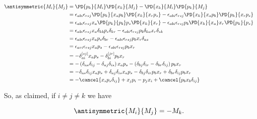 \begin{align*}
\antisymmetric{M_i}{M_j} 
&=
\PD{p_k}{M_i}
\PD{x_k}{M_j}
-
\PD{x_k}{M_i}
\PD{p_k}{M_j} \\
&=
\epsilon_{a b i}
\epsilon_{r s j}
\PD{p_k}{x_a p_b}
\PD{x_k}{x_r p_s}
-
\epsilon_{a b i} 
\epsilon_{r s j}
\PD{x_k}{x_a p_b}
\PD{p_k}{x_r p_s} \\
&=
\epsilon_{a b i}
\epsilon_{r s j}
x_a \PD{p_k}{p_b}
p_s \PD{x_k}{x_r}
-
\epsilon_{a b i} 
\epsilon_{r s j}
p_b \PD{x_k}{x_a}
x_r \PD{p_k}{p_s} \\
&=
\epsilon_{a b i}
\epsilon_{r s j}
x_a \delta_{k b}
p_s \delta_{k r}
-
\epsilon_{a b i} 
\epsilon_{r s j}
p_b \delta_{k a}
x_r \delta_{s k} \\
&=
\epsilon_{a b i}
\epsilon_{r s j}
x_a 
p_s \delta_{b r}
-
\epsilon_{a b i} 
\epsilon_{r s j}
p_b 
x_r \delta_{a s} \\
&=
\epsilon_{a r i}
\epsilon_{r s j}
x_a 
p_s 
-
\epsilon_{s b i} 
\epsilon_{r s j}
p_b 
x_r \\
&=
-
\delta_{a i}^{[s j]}
x_a 
p_s 
-
\delta_{b i}^{[j r]}
p_b 
x_r \\
&=
-
\left(
\delta_{a s}\delta_{i j}
-\delta_{a j}\delta_{i s}
\right)
x_a 
p_s 
-
\left(
\delta_{b j}\delta_{i r}
-\delta_{b r}\delta_{i j}
\right)
p_b 
x_r \\
&=
-
\delta_{a s}\delta_{i j}
x_a 
p_s 
+\delta_{a j}\delta_{i s}
x_a 
p_s 
-
\delta_{b j}\delta_{i r}
p_b 
x_r 
+\delta_{b r}\delta_{i j}
p_b 
x_r 
\\
&=
-
\cancel{
x_s 
p_s 
\delta_{i j}
}
+
x_j 
p_i 
-
p_j 
x_i 
+
\cancel{
p_b 
x_b 
\delta_{i j}
}
\\
\end{align*}

So, as claimed, if $i \ne j \ne k$ we have

\begin{equation}\label{eqn:phaseSpaceAndTrajectories:410}
\antisymmetric{M_i}{M_j} = -M_k.
\end{equation}

\EndNoBibArticle
